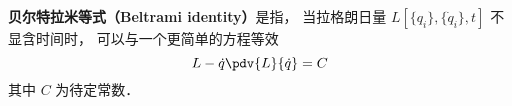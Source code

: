 
\begin{issues}
\issueDraft
\end{issues}


\textbf{贝尔特拉米等式（Beltrami identity）}是指， 当拉格朗日量 $L[\{q_i\}, \{\dot q_i\}, t]$ 不显含时间时， 可以与一个更简单的方程等效
\begin{equation}
L - \dot q \pdv{L}{\dot q} = C
\end{equation}
其中 $C$ 为待定常数．
